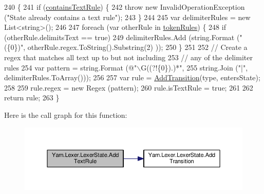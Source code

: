 \begin{DoxyCode}
240             \{
241                 \textcolor{keywordflow}{if} (\hyperlink{a00118_a69948f05c35eeae9cb8448c849a053e6}{containsTextRule}) \{
242                     \textcolor{keywordflow}{throw} \textcolor{keyword}{new} InvalidOperationException (\textcolor{stringliteral}{"State already contains a text rule"});
243                 \}
244 
245                 var delimiterRules = \textcolor{keyword}{new} List<string>();
246 
247                 \textcolor{keywordflow}{foreach} (var otherRule \textcolor{keywordflow}{in} \hyperlink{a00118_adf6563b1dc6f3ef80ed13c2b15b7be03}{tokenRules}) \{
248                     \textcolor{keywordflow}{if} (otherRule.delimitsText == \textcolor{keyword}{true})
249                         delimiterRules.Add (string.Format (\textcolor{stringliteral}{"(\{0\})"}, otherRule.regex.ToString().Substring(2)
      ));
250                 \}
251 
252                 \textcolor{comment}{// Create a regex that matches all text up to but not including}
253                 \textcolor{comment}{// any of the delimiter rules}
254                 var pattern = string.Format (\textcolor{stringliteral}{@"\(\backslash\)G((?!\{0\}).)*"},
255                     string.Join (\textcolor{stringliteral}{"|"}, delimiterRules.ToArray()));
256 
257                 var rule = \hyperlink{a00118_a71ba52744e853ff142de19e97cf5daed}{AddTransition}(type, entersState);
258 
259                 rule.regex = \textcolor{keyword}{new} Regex (pattern);
260                 rule.isTextRule = \textcolor{keyword}{true};
261 
262                 \textcolor{keywordflow}{return} rule;
263             \}
\end{DoxyCode}


Here is the call graph for this function\-:
\nopagebreak
\begin{figure}[H]
\begin{center}
\leavevmode
\includegraphics[width=350pt]{a00118_af183111863c651ae5681665a2c379830_cgraph}
\end{center}
\end{figure}


